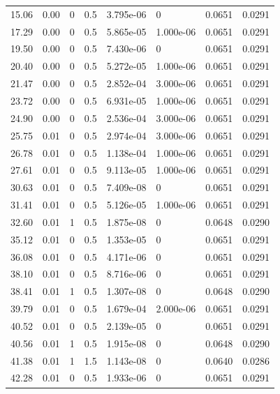 \documentclass[preview]{standalone}
\begin{document}
{{\begin{tabular}{L{1.2cm}C{1.2cm} C{0.3cm}C{0.5cm} C{1.4cm}C{1.4cm} C{1.4cm}C{1.4cm}}
  15.06  &  0.00  & 0     & 0.5 &  3.795e-06  & 0  & 0.0651 &  0.0291   \\ 
  17.29  &  0.00  & 0     & 0.5 &  5.865e-05  & 1.000e-06  & 0.0651 &  0.0291   \\ 
  19.50  &  0.00  & 0     & 0.5 &  7.430e-06  & 0  & 0.0651 &  0.0291   \\ 
  20.40  &  0.00  & 0     & 0.5 &  5.272e-05  & 1.000e-06  & 0.0651 &  0.0291   \\ 
  21.47  &  0.00  & 0     & 0.5 &  2.852e-04  & 3.000e-06  & 0.0651 &  0.0291   \\ 
  23.72  &  0.00  & 0     & 0.5 &  6.931e-05  & 1.000e-06  & 0.0651 &  0.0291   \\ 
  24.90  &  0.00  & 0     & 0.5 &  2.536e-04  & 3.000e-06  & 0.0651 &  0.0291   \\ 
  25.75  &  0.01  & 0     & 0.5 &  2.974e-04  & 3.000e-06  & 0.0651 &  0.0291   \\ 
  26.78  &  0.01  & 0     & 0.5 &  1.138e-04  & 1.000e-06  & 0.0651 &  0.0291   \\ 
  27.61  &  0.01  & 0     & 0.5 &  9.113e-05  & 1.000e-06  & 0.0651 &  0.0291   \\ 
  30.63  &  0.01  & 0     & 0.5 &  7.409e-08  & 0  & 0.0651 &  0.0291   \\ 
  31.41  &  0.01  & 0     & 0.5 &  5.126e-05  & 1.000e-06  & 0.0651 &  0.0291   \\ 
  32.60  &  0.01  & 1     & 0.5 &  1.875e-08  & 0  & 0.0648 &  0.0290   \\ 
  35.12  &  0.01  & 0     & 0.5 &  1.353e-05  & 0  & 0.0651 &  0.0291   \\ 
  36.08  &  0.01  & 0     & 0.5 &  4.171e-06  & 0  & 0.0651 &  0.0291   \\ 
  38.10  &  0.01  & 0     & 0.5 &  8.716e-06  & 0  & 0.0651 &  0.0291   \\ 
  38.41  &  0.01  & 1     & 0.5 &  1.307e-08  & 0  & 0.0648 &  0.0290   \\ 
  39.79  &  0.01  & 0     & 0.5 &  1.679e-04  & 2.000e-06  & 0.0651 &  0.0291   \\ 
  40.52  &  0.01  & 0     & 0.5 &  2.139e-05  & 0  & 0.0651 &  0.0291   \\ 
  40.56  &  0.01  & 1     & 0.5 &  1.915e-08  & 0  & 0.0648 &  0.0290   \\ 
  41.38  &  0.01  & 1     & 1.5 &  1.143e-08  & 0  & 0.0640 &  0.0286   \\ 
  42.28  &  0.01  & 0     & 0.5 &  1.933e-06  & 0  & 0.0651 &  0.0291   \\ 

\end{tabular}}}
\end{document}
